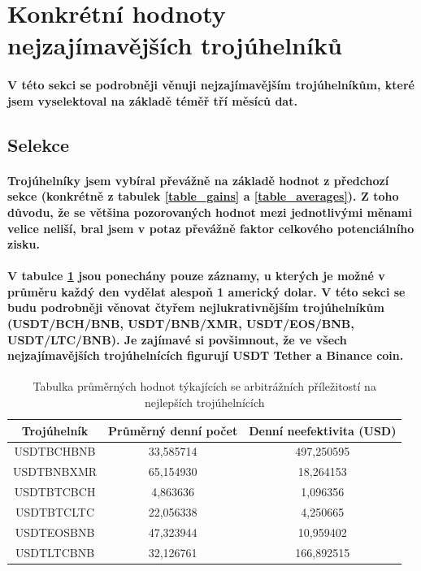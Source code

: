 \documentclass[thesis=B,czech]{FITthesis}[2019/03/21]
\begin{document}
\section{Konkrétní hodnoty nejzajímavějších trojúhelníků}
\paragraph{
V této sekci se podrobněji věnuji nejzajímavějším trojúhelníkům, které jsem vyselektoval na základě téměř tří měsíců dat. 
}
\subsection{Selekce}
\paragraph{
Trojúhelníky jsem vybíral převážně na základě hodnot z předchozí sekce (konkrétně z tabulek \ref{table_gains} a \ref{table_averages}). Z toho důvodu, že se většina pozorovaných hodnot mezi jednotlivými měnami velice neliší, bral jsem v potaz převážně faktor celkového potenciálního zisku.
}
\paragraph{
V tabulce \ref{table_combined_best} jsou ponechány pouze záznamy, u kterých je možné v průměru každý den vydělat alespoň 1 americký dolar. V této sekci se budu podrobněji věnovat čtyřem nejlukrativnějším trojúhelníkům (USDT/BCH/BNB, USDT/BNB/XMR, USDT/EOS/BNB, USDT/LTC/BNB).
Je zajímavé si povšimnout, že ve všech nejzajímavějších trojúhelnících figurují USDT Tether a Binance coin.
}

\begin{table}\centering
\caption{Tabulka průměrných hodnot týkajících se arbitrážních příležitostí na nejlepších trojúhelnících}
\label{table_combined_best}
\begin{tabular}{|| c | c | c ||}\hline Trojúhelník & Průměrný denní počet & Denní neefektivita (USD)\\ [0.5ex]
 \hline\hline USDTBCHBNB & 33,585714 & 497,250595\\ 
 \hline USDTBNBXMR & 65,154930 & 18,264153\\ 
 \hline USDTBTCBCH & 4,863636 & 1,096356\\ 
 \hline USDTBTCLTC & 22,056338 & 4,250665\\ 
 \hline USDTEOSBNB & 47,323944 & 10,959402\\ 
 \hline USDTLTCBNB & 32,126761 & 166,892515\\ 
 \hline
\end{tabular}
\end{table}
\end{document}
